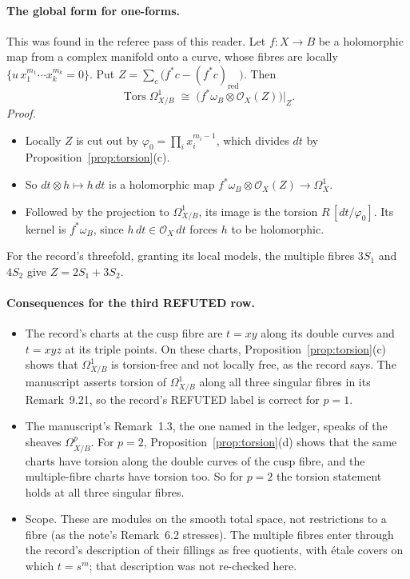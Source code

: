 \paragraph{The global form for one-forms.} This was found in the referee pass of this reader. Let $f:X\to B$ be a holomorphic map from a complex manifold onto a curve, whose fibres are locally $\{u\,x_1^{m_1}\cdots x_k^{m_k}=0\}$. Put $Z=\sum_c\bigl(f^*c-(f^*c)_{\mathrm{red}}\bigr)$. Then
\[
\operatorname{Tors}\Omega^1_{X/B}\;\cong\;\bigl(f^*\omega_B\otimes\mathcal O_X(Z)\bigr)\big|_Z .
\]
\emph{Proof.}
\begin{itemize}
\item Locally $Z$ is cut out by $\varphi_0=\prod_ix_i^{m_i-1}$, which divides $dt$ by Proposition~\ref{prop:torsion}(c).
\item So $dt\otimes h\mapsto h\,dt$ is a holomorphic map $f^*\omega_B\otimes\mathcal O_X(Z)\to\Omega^1_X$.
\item Followed by the projection to $\Omega^1_{X/B}$, its image is the torsion $R\,[dt/\varphi_0]$. Its kernel is $f^*\omega_B$, since $h\,dt\in\mathcal O_X\,dt$ forces $h$ to be holomorphic.
\end{itemize}
For the record's threefold, granting its local models, the multiple fibres $3S_1$ and $4S_2$ give $Z=2S_1+3S_2$.

\paragraph{Consequences for the third \textsf{REFUTED} row.}
\begin{itemize}
\item The record's charts at the cusp fibre are $t=xy$ along its double curves and $t=xyz$ at its triple points. On these charts, Proposition~\ref{prop:torsion}(c) shows that $\Omega^1_{X/B}$ is torsion-free and not locally free, as the record says. The manuscript asserts torsion of $\Omega^1_{X/B}$ along all three singular fibres in its Remark~9.21, so the record's \textsf{REFUTED} label is correct for $p=1$.
\item The manuscript's Remark~1.3, the one named in the ledger, speaks of the sheaves $\Omega^p_{X/B}$. For $p=2$, Proposition~\ref{prop:torsion}(d) shows that the same charts have torsion along the double curves of the cusp fibre, and the multiple-fibre charts have torsion too. So for $p=2$ the torsion statement holds at all three singular fibres.
\item Scope. These are modules on the smooth total space, not restrictions to a fibre (as the note's Remark~6.2 stresses). The multiple fibres enter through the record's description of their fillings as free quotients, with étale covers on which $t=s^m$; that description was not re-checked here.
\end{itemize}

